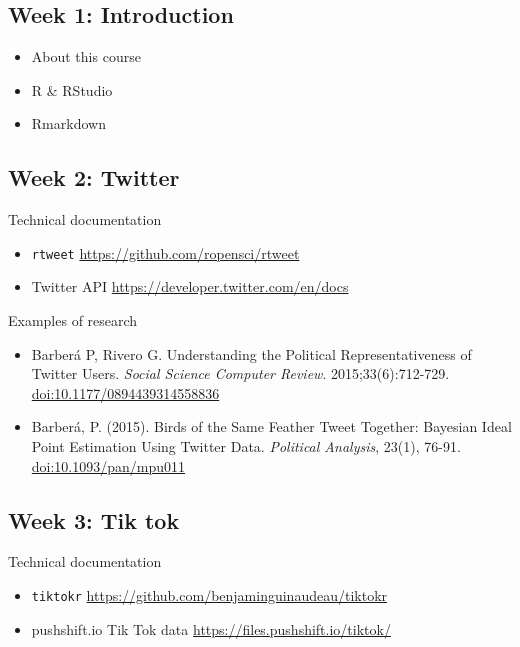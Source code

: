 \documentclass[11pt,]{article}
\providecommand{\tightlist}{%
  \setlength{\itemsep}{0pt}\setlength{\parskip}{0pt}}
\begin{document}
\hypertarget{week-1-introduction}{%
\subsection{Week 1: Introduction}\label{week-1-introduction}}

\begin{itemize}
\tightlist
\item
  About this course
\item
  R \& RStudio
\item
  Rmarkdown
\end{itemize}

\hypertarget{week-2-twitter}{%
\subsection{Week 2: Twitter}\label{week-2-twitter}}

Technical documentation

\begin{itemize}
\tightlist
\item
  \texttt{rtweet} \url{https://github.com/ropensci/rtweet}
\item
  Twitter API \url{https://developer.twitter.com/en/docs}
\end{itemize}

Examples of research

\begin{itemize}
\tightlist
\item
  Barberá P, Rivero G. Understanding the Political Representativeness of
  Twitter Users. \emph{Social Science Computer Review}.
  2015;33(6):712-729. \url{doi:10.1177/0894439314558836}
\item
  Barberá, P. (2015). Birds of the Same Feather Tweet Together: Bayesian
  Ideal Point Estimation Using Twitter Data. \emph{Political Analysis},
  23(1), 76-91. \url{doi:10.1093/pan/mpu011}
\end{itemize}

\hypertarget{week-3-tik-tok}{%
\subsection{Week 3: Tik tok}\label{week-3-tik-tok}}

Technical documentation

\begin{itemize}
\tightlist
\item
  \texttt{tiktokr} \url{https://github.com/benjaminguinaudeau/tiktokr}
\item
  pushshift.io Tik Tok data \url{https://files.pushshift.io/tiktok/}
\end{itemize}
\end{document}
